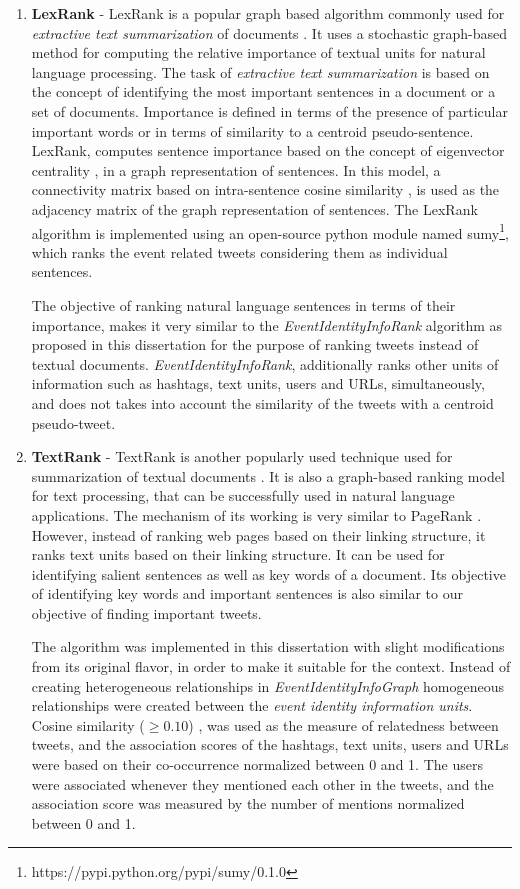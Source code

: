 \begin{enumerate}
\item \textbf{LexRank} - LexRank is a popular graph based algorithm commonly used for \textit{extractive text summarization} of documents \cite{erkan2004lexrank}. It uses a stochastic graph-based method for computing the relative importance of textual units for natural language processing. The task of \textit{extractive text summarization} is based on the concept of identifying the most important sentences in a document or a set of documents. Importance is defined in terms of the presence of particular important words or in terms of similarity to a centroid pseudo-sentence. LexRank, computes sentence importance based on the concept of eigenvector centrality \cite{ruhnau2000eigenvector}, in a graph representation of sentences. In this model, a connectivity matrix based on intra-sentence cosine similarity \cite{garcia2006cosine}, is used as the adjacency matrix of the graph representation of sentences. The LexRank algorithm is implemented using an open-source python module named sumy\footnote{\tiny https://pypi.python.org/pypi/sumy/0.1.0}, which ranks the event related tweets considering them as individual sentences.

The objective of ranking natural language sentences in terms of their importance, makes it very similar to the \textit{EventIdentityInfoRank} algorithm as proposed in this dissertation for the purpose of ranking tweets instead of textual documents. \textit{EventIdentityInfoRank}, additionally ranks other units of information such as hashtags, text units, users and URLs, simultaneously, and does not takes into account the similarity of the tweets with a centroid pseudo-tweet. 

\item \textbf{TextRank} - TextRank is another popularly used technique used for summarization of textual documents \cite{Mihalcea2004}.  It is also a graph-based
ranking model for text processing, that can be successfully used in natural language
applications. The mechanism of its working is very similar to PageRank \cite{page1999pagerank}. However, instead of ranking web pages based on their linking structure, it ranks text units based on their linking structure. It can be used for identifying salient sentences as well as key words of a document. Its objective of identifying key words and important sentences is also similar to our objective of finding important tweets.

The algorithm was implemented in this dissertation with slight modifications from its original flavor, in order to make it suitable for the context. Instead of creating heterogeneous relationships in \textit{EventIdentityInfoGraph} homogeneous relationships were created between the \textit{event identity information units}. Cosine similarity ($ \ge 0.10$) \cite{garcia2006cosine}, was used as the measure of relatedness between tweets, and the association scores of the hashtags, text units, users and URLs were based on their co-occurrence normalized between 0 and 1. The users were associated whenever they mentioned each other in the tweets, and the association score was measured by the number of mentions normalized between 0 and 1.



\end{enumerate}

